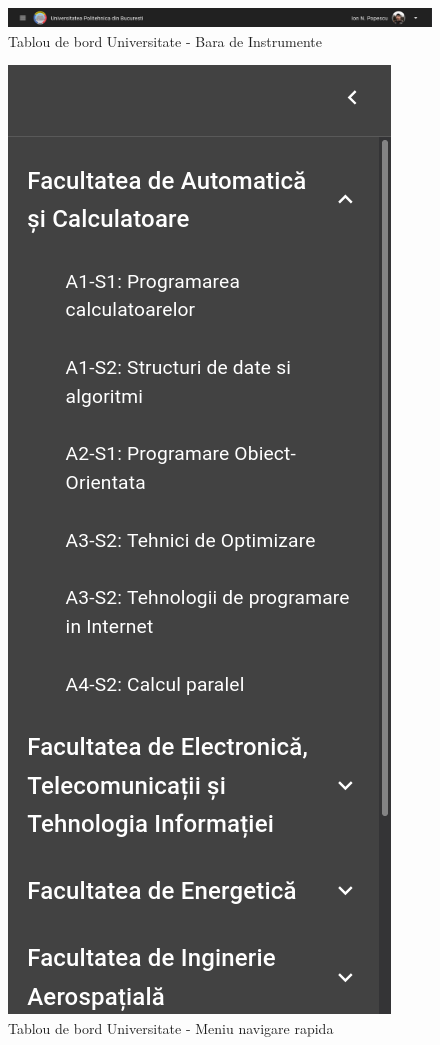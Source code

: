 \documentclass[12pt, a4paper, oneside, romanian]{teza-upb}
\begin{document}
\begin{figure}[H]
\centering
\includegraphics*[width=\columnwidth]{tablou-de-bord-universitate-bara-de-instrumente}
\caption{Tablou de bord Universitate - Bara de Instrumente}
\label{tablou-de-bord-universitate-bara-de-instrumente}
\end{figure}

\begin{figure}[H]
\centering
\includegraphics*[width=0.4\columnwidth]{tablou-de-bord-universitate-meniu-navigare-rapida}
\caption{Tablou de bord Universitate - Meniu navigare rapida}
\label{tablou-de-bord-universitate-meniu-navigare-rapida}
\end{figure}
\end{document}
